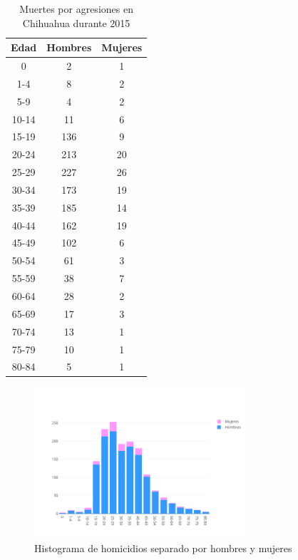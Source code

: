 \documentclass[fontsize=11pt]{article}
\begin{document}
\begin{table}[H]
\centering

\begin{tabular}{|c|c|c|}
\hline
Edad  & Hombres & Mujeres \\ \hline
0     & 2       & 1       \\ \hline
1-4   & 8       & 2       \\ \hline
5-9   & 4       & 2       \\ \hline
10-14 & 11      & 6       \\ \hline
15-19 & 136     & 9       \\ \hline
20-24 & 213     & 20      \\ \hline
25-29 & 227     & 26      \\ \hline
30-34 & 173     & 19      \\ \hline
35-39 & 185     & 14      \\ \hline
40-44 & 162     & 19      \\ \hline
45-49 & 102     & 6       \\ \hline
50-54 & 61      & 3       \\ \hline
55-59 & 38      & 7       \\ \hline
60-64 & 28      & 2       \\ \hline
65-69 & 17      & 3       \\ \hline
70-74 & 13      & 1       \\ \hline
75-79 & 10      & 1       \\ \hline
80-84 & 5       & 1       \\ \hline
\end{tabular}
\caption{Muertes por agresiones en Chihuahua durante 2015}
\end{table}
\label{my-label}
\begin{figure}[H]
\centering
\includegraphics[width=0.7\textwidth]{homihist}
\caption{Histograma de homicidios separado por hombres y mujeres}
\end{figure}
\end{document}
